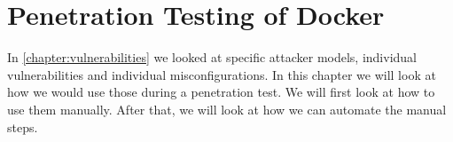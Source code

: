 \chapter{Penetration Testing of Docker}\label{chapter:pentesting}

In \autoref{chapter:vulnerabilities} we looked at specific attacker models, individual vulnerabilities and individual misconfigurations. In this chapter we will look at how we would use those during a penetration test. We will first look at how to use them manually. After that, we will look at how we can automate the manual steps.




